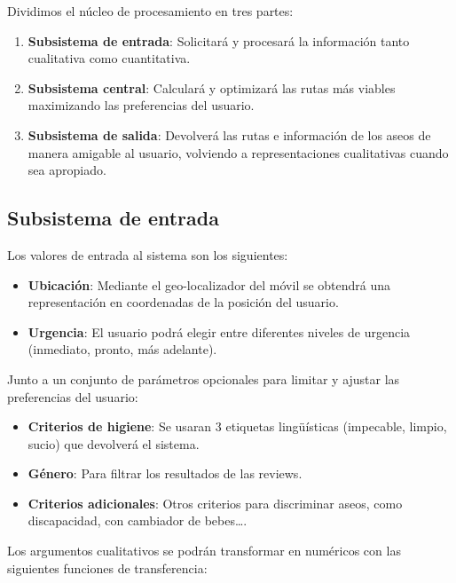 \documentclass[13pt,a4paper]{article}
\begin{document}
Dividimos el núcleo de procesamiento en tres partes:
\begin{enumerate}
  \item \textbf{Subsistema de entrada}: Solicitará y procesará la información tanto cualitativa como cuantitativa.
  \item \textbf{Subsistema central}: Calculará y optimizará las rutas más viables maximizando las preferencias del usuario.
  \item \textbf{Subsistema de salida}: Devolverá las rutas e información de los aseos de manera amigable al usuario, volviendo a representaciones cualitativas cuando sea apropiado.
\end{enumerate}

\subsection{Subsistema de entrada}

Los valores de entrada al sistema son los siguientes:
\begin{itemize}
  \item \textbf{Ubicación}: Mediante el geo-localizador del móvil se obtendrá una representación en coordenadas de la posición del usuario.
  \item \textbf{Urgencia}: El usuario podrá elegir entre diferentes niveles de urgencia (inmediato, pronto, más adelante). 
\end{itemize}

Junto a un conjunto de parámetros opcionales para limitar y ajustar las preferencias del usuario:
\begin{itemize}
  \item \textbf{Criterios de higiene}: Se usaran 3 etiquetas lingüísticas (impecable, limpio, sucio) que devolverá el sistema.
  \item \textbf{Género}: Para filtrar los resultados de las reviews.
  \item \textbf{Criterios adicionales}: Otros criterios para discriminar aseos, como discapacidad, con cambiador de bebes\dots.
\end{itemize}

Los argumentos cualitativos se podrán transformar en numéricos con las siguientes funciones de transferencia:
\end{document}
